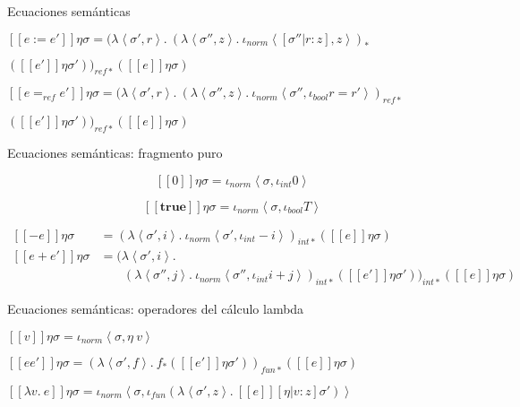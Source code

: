\documentclass{beamer}
\newcommand{\se}[1]{\mbox{$[\![#1]\!]$}}
\newcommand{\s}{\sigma }
\newcommand{\la}{\left\langle }
\newcommand{\ra}{\right\rangle }
\begin{document}
\begin{frame}{Ecuaciones semánticas}

\medskip$\se{e:=e'}\eta\s = (\lambda \la\s',r\ra.\ (\lambda \la\s'',z\ra.\ \iota_{norm} \la[\s''|r:z],z\ra)_* $

\medskip \qquad\qquad\qquad\qquad\qquad\qquad\qquad\qquad\qquad$(\se{e'}\eta\s') )_{ref*} (\se{e}\eta\s)$

\bigskip


\bigskip

$\se{e=_{ref}e'}\eta\s = (\lambda \la\s',r\ra.\ (\lambda \la\s'',z\ra.\ \iota_{norm} \la\s'',\iota_{bool}r=r'\ra)_{ref*}   $

\medskip 


\qquad\qquad\qquad\qquad\qquad\qquad\qquad\qquad\qquad$(\se{e'}\eta\s') )_{ref*}(\se{e}\eta\s)$


\end{frame}



\begin{frame}{Ecuaciones semánticas: fragmento puro}


\[\se{0}\eta\s = \iota_{norm}\la \s,\iota_{int}0\ra\]

\[\se{\textbf{true}}\eta\s = \iota_{norm}\la \s,\iota_{bool}T\ra \]
\pause
\medskip

\begin{align*}
\se{-e}\eta\s &= (\lambda \la \s',i\ra.\ \iota_{norm}\la \s',\iota_{int}-i\ra)_{int*}(\se{e}\eta\s) \\
  \se{e+e'}\eta\s &= (\lambda \la \s',i\ra.\\
  & \phantom{(\lambda \la \right.} (\lambda \la \s'',j\ra.\  \iota_{norm}\la \s'',\iota_{int}i+j\ra)_{int*}(\se{e'}\eta\s'))_{int*} (\se{e}\eta\s)
\end{align*}

\end{frame}


\begin{frame}{Ecuaciones semánticas: operadores del cálculo lambda}


\medskip 

$\se{v}\eta\s = \iota_{norm}\la\sigma,\eta\ v\ra$
\pause

\bigskip 


$\se{ee'}\eta\s = (\lambda \la \s',f\ra.\ f_* (\se{e'}\eta\s'))_{fun*}(\se{e}\eta\s)$
\pause
\bigskip 

$\se{\lambda v.\  e}\eta\s =  \iota_{norm}\la \s, \iota_{fun}(\lambda \la\s',z\ra.\ \se{e}[\eta|v:z]\s')\ra$

\end{frame}
\end{document}
